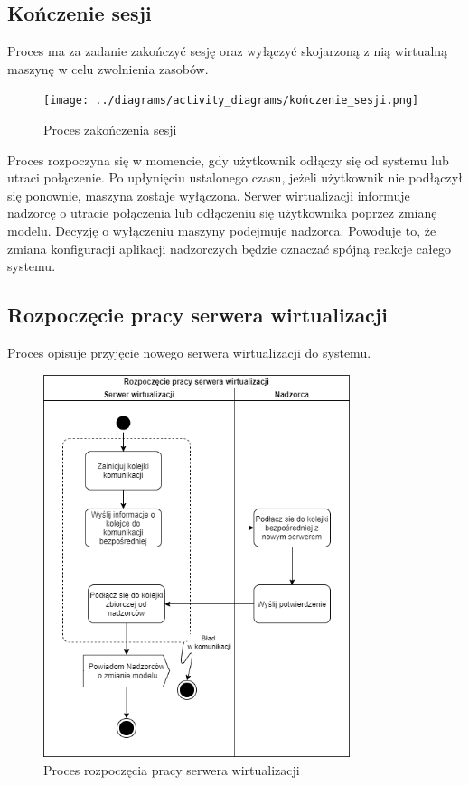 \documentclass[../opis-rozwiazania.tex]{subfiles}
\begin{document}
\subsection{Kończenie sesji}

Proces ma za zadanie zakończyć sesję oraz wyłączyć skojarzoną z nią wirtualną maszynę w celu zwolnienia zasobów.

\begin{figure}[H]
  \centering
  \texttt{[image: ../diagrams/activity\_diagrams/kończenie\_sesji.png]}
  \caption{Proces zakończenia sesji}
  \label{finish_session}
\end{figure}

Proces rozpoczyna się w momencie, gdy użytkownik odłączy się od systemu lub utraci połączenie. Po upłynięciu ustalonego czasu, jeżeli użytkownik nie podłączył się ponownie, maszyna zostaje wyłączona.
Serwer wirtualizacji informuje nadzorcę o utracie połączenia lub odłączeniu się użytkownika poprzez zmianę modelu.
Decyzję o wyłączeniu maszyny podejmuje nadzorca.
Powoduje to, że zmiana konfiguracji aplikacji nadzorczych będzie oznaczać spójną reakcje całego systemu.

\subsection{Rozpoczęcie pracy serwera wirtualizacji}

Proces opisuje przyjęcie nowego serwera wirtualizacji do systemu.

\begin{figure}[H]
  \centering
  \includegraphics[width=0.8\textwidth]{../diagrams/activity_diagrams/serwer_start.png}
  \caption{Proces rozpoczęcia pracy serwera wirtualizacji}
  \label{start_virtsrv}
\end{figure}
\end{document}
